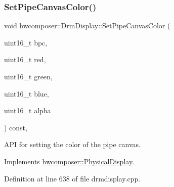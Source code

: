\subsubsection{\texorpdfstring{Set\+Pipe\+Canvas\+Color()}{SetPipeCanvasColor()}}
{\footnotesize\ttfamily void hwcomposer\+::\+Drm\+Display\+::\+Set\+Pipe\+Canvas\+Color (\begin{DoxyParamCaption}\item[{uint16\+\_\+t}]{bpc,  }\item[{uint16\+\_\+t}]{red,  }\item[{uint16\+\_\+t}]{green,  }\item[{uint16\+\_\+t}]{blue,  }\item[{uint16\+\_\+t}]{alpha }\end{DoxyParamCaption}) const\hspace{0.3cm}{\ttfamily [override]}, {\ttfamily [virtual]}}

A\+PI for setting the color of the pipe canvas. 

Implements \mbox{\hyperlink{classhwcomposer_1_1PhysicalDisplay_a3aeed39dd1af137ed16d83c4dfdcafad}{hwcomposer\+::\+Physical\+Display}}.



Definition at line 638 of file drmdisplay.\+cpp.


